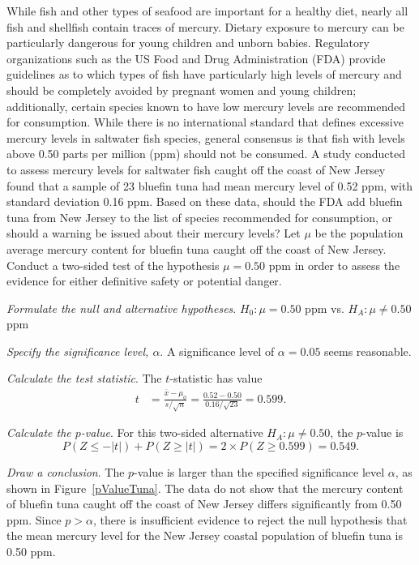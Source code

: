 \begin{examplewrap}
\begin{nexample}{While fish and other types of seafood are important for a healthy diet, nearly all fish and shellfish contain traces of mercury. Dietary exposure to mercury can be particularly dangerous for young children and unborn babies. Regulatory organizations such as the US Food and Drug Administration (FDA) provide guidelines as to which types of fish have particularly high levels of mercury and should be completely avoided by pregnant women and young children; additionally, certain species known to have low mercury levels are recommended for consumption. While there is no international standard that defines excessive mercury levels in saltwater fish species, general consensus is that fish with levels above 0.50 parts per million (ppm) should not be consumed. A study conducted to assess mercury levels for saltwater fish caught off the coast of New Jersey found that a sample of 23 bluefin tuna had mean mercury level of 0.52 ppm, with standard deviation 0.16 ppm.\footnotemark{} Based on these data, should the FDA add bluefin tuna from New Jersey to the list of species recommended for consumption, or should a warning be issued about their mercury levels?}\label{hypTestTuna}%
Let $\mu$ be the population average mercury content for bluefin tuna caught off the coast of New Jersey. Conduct a two-sided test of the hypothesis $\mu = 0.50$ ppm in order to assess the evidence for either definitive safety or potential danger.

\textit{Formulate the null and alternative hypotheses}. $H_0: \mu = 0.50$ ppm vs. $H_A: \mu \neq 0.50$ ppm

\textit{Specify the significance level, $\alpha$}.  A significance level of $\alpha = 0.05$ seems reasonable. 

\textit{Calculate the test statistic}. The  $t$-statistic has value
\begin{align*}
t &= \frac{\overline{x}-\mu_0}{s/\sqrt{n}} = \frac{0.52 - 0.50} {0.16/\sqrt{23}} = 0.599.
\end{align*}

\textit{Calculate the $p$-value}. For this two-sided alternative $H_A: \mu \neq 0.50$, the $p$-value is 
\[P(Z \leq -|t|) + P(Z \geq |t|) = 2 \times P(Z \geq 0.599) = 0.549.\]

\textit{Draw a conclusion}. The $p$-value is larger than the specified significance level $\alpha$, as shown in Figure~\ref{pValueTuna}.\footnotemark{} The data do not show that the mercury content of bluefin tuna caught off the coast of New Jersey differs significantly from 0.50 ppm. Since $p > \alpha$, there is insufficient evidence to reject the null hypothesis that the mean mercury level for the New Jersey coastal population of bluefin tuna is 0.50 ppm. 


\end{nexample}
\end{examplewrap}
